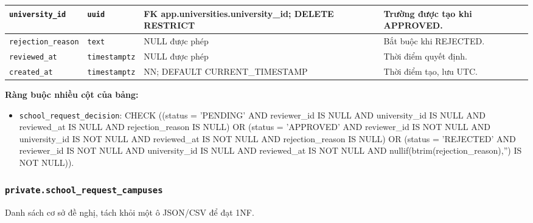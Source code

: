\begin{longtable}{|>{\raggedright\arraybackslash}p{.20\linewidth}|>{\raggedright\arraybackslash}p{.14\linewidth}|>{\raggedright\arraybackslash}p{.31\linewidth}|>{\raggedright\arraybackslash}p{.27\linewidth}|}
\texttt{university\_\allowbreak{}id} & \texttt{uuid} & FK app.universities.university\_\allowbreak{}id; DELETE RESTRICT & Trường được tạo khi APPROVED. \\ \hline

\texttt{rejection\_\allowbreak{}reason} & \texttt{text} & NULL được phép & Bắt buộc khi REJECTED. \\ \hline

\texttt{reviewed\_\allowbreak{}at} & \texttt{timestamptz} & NULL được phép & Thời điểm quyết định. \\ \hline

\texttt{created\_\allowbreak{}at} & \texttt{timestamptz} & NN; DEFAULT CURRENT\_\allowbreak{}TIMESTAMP & Thời điểm tạo,\allowbreak{} lưu UTC. \\ \hline

\end{longtable}

\textbf{Ràng buộc nhiều cột của bảng:}

\begin{itemize}

\item \texttt{school\_\allowbreak{}request\_\allowbreak{}decision}: CHECK ((status = 'PENDING' AND reviewer\_\allowbreak{}id IS NULL AND university\_\allowbreak{}id IS NULL AND reviewed\_\allowbreak{}at IS NULL AND rejection\_\allowbreak{}reason IS NULL) OR (status = 'APPROVED' AND reviewer\_\allowbreak{}id IS NOT NULL AND university\_\allowbreak{}id IS NOT NULL AND reviewed\_\allowbreak{}at IS NOT NULL AND rejection\_\allowbreak{}reason IS NULL) OR (status = 'REJECTED' AND reviewer\_\allowbreak{}id IS NOT NULL AND university\_\allowbreak{}id IS NULL AND reviewed\_\allowbreak{}at IS NOT NULL AND nullif(btrim(rejection\_\allowbreak{}reason),\allowbreak{}'') IS NOT NULL)).

\end{itemize}

\subsubsection*{\texttt{private.school\_\allowbreak{}request\_\allowbreak{}campuses}}

Danh sách cơ sở đề nghị,\allowbreak{} tách khỏi một ô JSON/CSV để đạt 1NF.

